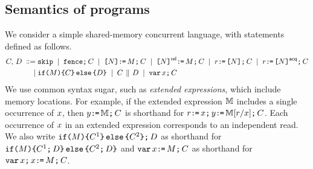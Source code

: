 \subsection{Semantics of programs}
\label{sec:semantics}

We consider a simple shared-memory concurrent language, with statements defined as follows.
\begin{align*}
\aCmd,\,\bCmd
\BNFDEF& \SKIP
\BNFSEP \FENCE\SEMI \aCmd
\BNFSEP \REF{\bExp}\GETS\aExp\SEMI \aCmd
\BNFSEP \REF{\bExp}\REL\GETS\aExp\SEMI \aCmd
\BNFSEP \aReg\GETS\REF{\bExp}\SEMI \aCmd
\BNFSEP \aReg\GETS\REF{\bExp}\ACQ\SEMI \aCmd \\
\BNFSEP& \IF{\aExp} \THEN \aCmd \ELSE \bCmd \FI
\BNFSEP \aCmd \PAR \bCmd
\BNFSEP \VAR\aLoc\SEMI \aCmd
\end{align*}
We use common syntax sugar, such as \emph{extended expressions}, which include
memory locations.  For example, if the extended expression $\aEExp$ includes
a single occurrence of $\aLoc$, then $\bLoc\GETS\aEExp\SEMI \aCmd$ is
shorthand for $\aReg\GETS\aLoc\SEMI\bLoc\GETS\aEExp[\aReg/\aLoc]\SEMI \aCmd$.
Each occurrence of $\aLoc$ in an extended expression corresponds to an
independent read.  We also write
$\IF{\aExp} \THEN \aCmd^1 \ELSE \aCmd^2 \FI \SEMI \bCmd$ as shorthand for
$\IF{\aExp} \THEN \aCmd^1 \SEMI \bCmd\ELSE \aCmd^2 \SEMI \bCmd\FI$ and
$\VAR\aLoc\GETS\aExp\SEMI \aCmd$ as shorthand for
$\VAR\aLoc\SEMI\aLoc\GETS\aExp\SEMI \aCmd$.

